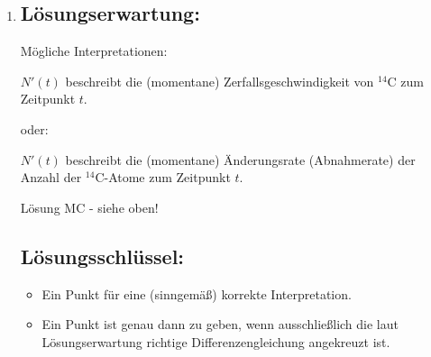 \begin{langesbeispiel}
{\begin{enumerate}
	\subsection{Lösungsschlüssel:}
	
\begin{itemize}
	\item   Ein punkt für ein korrektes Intervall.
	
	Toleranzintervall für $t_1:[5\,164;5\,174]$, für $t_2:[5\,320;5\,330]$
	\item Ein Punkt für eine (sinngemäß) korrekte Begründung.
\end{itemize}

\item \subsection{Lösungserwartung:}
	Mögliche Interpretationen:
	
	$N'(t)$ beschreibt die (momentane) Zerfallsgeschwindigkeit von $^{14}$C zum Zeitpunkt $t$.
	
	oder:
	
	$N'(t)$ beschreibt die (momentane) Änderungsrate (Abnahmerate) der Anzahl der $^{14}$C-Atome zum Zeitpunkt $t$.
	
	Lösung MC - siehe oben!

	\subsection{Lösungsschlüssel:}
	
\begin{itemize}
	\item Ein Punkt für eine (sinngemäß) korrekte Interpretation.
	\item Ein Punkt ist genau dann zu geben, wenn ausschließlich die laut Lösungserwartung richtige Differenzengleichung angekreuzt ist.
\end{itemize}

\end{enumerate}}
		\end{langesbeispiel}